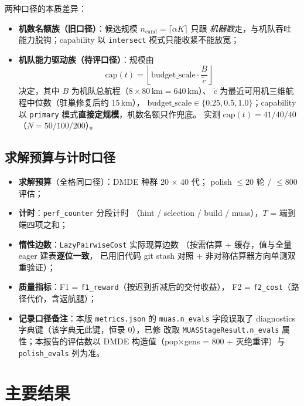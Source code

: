 \documentclass[a4paper,11pt]{article}
\newcommand{\fname}[1]{{\ttfamily\seqsplit{#1}}}
\begin{document}
两种口径的本质差异：

\begin{itemize}
  \item \textbf{机数名额族（旧口径）}：候选规模 $n_{\mathrm{cand}} = \lceil \alpha K \rceil$ 只跟
        \emph{机器数}走，与机队吞吐能力脱钩；capability 以 \texttt{intersect}
        模式只能收紧不能放宽；
  \item \textbf{机队能力驱动族（待评口径）}：规模由
        \[
          \mathrm{cap}(t) = \left\lfloor \mathrm{budget\_scale} \cdot
          \frac{B}{\tilde{c}} \right\rfloor
        \]
        决定，其中 $B$ 为机队总航程（$8 \times 80\,\mathrm{km} = 640$\,km）、
        $\tilde{c}$ 为最近可用机三维航程中位数（驻巢修复后约 15\,km），
        $\mathrm{budget\_scale} \in \{0.25, 0.5, 1.0\}$；capability 以
        \texttt{primary} 模式\textbf{直接定规模}，机数名额只作兜底。
        实测 $\mathrm{cap}(t) = 41/40/40$（$N = 50/100/200$）。
\end{itemize}

\subsection{求解预算与计时口径}

\begin{itemize}
  \item \textbf{求解预算}（全格同口径）：DMDE 种群 20 × 40 代；
        polish $\le 20$ 轮 / $\le 800$ 评估；
  \item \textbf{计时}：\texttt{perf\_counter} 分段计时
        （hint / selection / build / muas），$T$ = 端到端四项之和；
  \item \textbf{惰性边数}：\texttt{LazyPairwiseCost} 实际现算边数
        （按需估算 + 缓存，值与全量 eager 建表\textbf{逐位一致}，
        已用旧代码 git stash 对照 + 非对称估算器方向单测双重验证）；
  \item \textbf{质量指标}：F1 = \texttt{f1\_reward}（按迟到折减后的交付收益），
        F2 = \texttt{f2\_cost}（路径代价，含返航腿）；
  \item \textbf{记录口径备注}：本版 \texttt{metrics.json} 的 \texttt{muas.n\_evals}
        字段误取了 diagnostics 字典键（该字典无此键，恒录 0），已修 \fname{run.py}
        改取 \texttt{MUASStageResult.n\_evals} 属性；本报告的评估数以 DMDE
        构造值（pop×gens = 800 + 灭绝重评）与 \texttt{polish\_evals} 列为准。
\end{itemize}

\section{主要结果}
\end{document}
